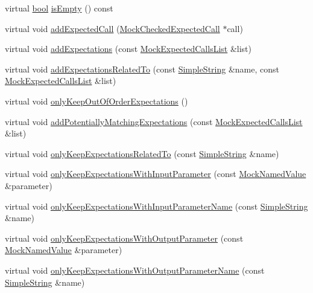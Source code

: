 \begin{DoxyCompactItemize}
\item 
virtual \hyperlink{avb__gptp_8h_af6a258d8f3ee5206d682d799316314b1}{bool} \hyperlink{class_mock_expected_calls_list_a479432127ee77145cc19d6a2d1590821}{is\+Empty} () const 
\item 
virtual void \hyperlink{class_mock_expected_calls_list_a93aa2234c01260b1e76ceef59f8cfaee}{add\+Expected\+Call} (\hyperlink{class_mock_checked_expected_call}{Mock\+Checked\+Expected\+Call} $\ast$call)
\item 
virtual void \hyperlink{class_mock_expected_calls_list_a391840ec7f7c5cef242747f126ce4484}{add\+Expectations} (const \hyperlink{class_mock_expected_calls_list}{Mock\+Expected\+Calls\+List} \&list)
\item 
virtual void \hyperlink{class_mock_expected_calls_list_a462f63288f7f9ae4b33d0b5d0eca265e}{add\+Expectations\+Related\+To} (const \hyperlink{class_simple_string}{Simple\+String} \&name, const \hyperlink{class_mock_expected_calls_list}{Mock\+Expected\+Calls\+List} \&list)
\item 
virtual void \hyperlink{class_mock_expected_calls_list_af78904a7f66b28b2c3d88ddfd5f0479a}{only\+Keep\+Out\+Of\+Order\+Expectations} ()
\item 
virtual void \hyperlink{class_mock_expected_calls_list_acc0ff899b5ca2a40e906b2966e9e340f}{add\+Potentially\+Matching\+Expectations} (const \hyperlink{class_mock_expected_calls_list}{Mock\+Expected\+Calls\+List} \&list)
\item 
virtual void \hyperlink{class_mock_expected_calls_list_a108af446766baeaec398000b6a4fd418}{only\+Keep\+Expectations\+Related\+To} (const \hyperlink{class_simple_string}{Simple\+String} \&name)
\item 
virtual void \hyperlink{class_mock_expected_calls_list_a22b3e41fc543763ee323cf2fb84f7820}{only\+Keep\+Expectations\+With\+Input\+Parameter} (const \hyperlink{class_mock_named_value}{Mock\+Named\+Value} \&parameter)
\item 
virtual void \hyperlink{class_mock_expected_calls_list_a1f78cc6c0afaaab2bc11c4de935d73b5}{only\+Keep\+Expectations\+With\+Input\+Parameter\+Name} (const \hyperlink{class_simple_string}{Simple\+String} \&name)
\item 
virtual void \hyperlink{class_mock_expected_calls_list_a972b3fc801d32ecaf8039bd3206bb58e}{only\+Keep\+Expectations\+With\+Output\+Parameter} (const \hyperlink{class_mock_named_value}{Mock\+Named\+Value} \&parameter)
\item 
virtual void \hyperlink{class_mock_expected_calls_list_a592c38feae5b168c2e7303bc2cbeeeec}{only\+Keep\+Expectations\+With\+Output\+Parameter\+Name} (const \hyperlink{class_simple_string}{Simple\+String} \&name)

\end{DoxyCompactItemize}
